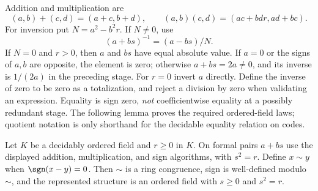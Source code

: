 Addition and multiplication are
\[
 (a,b)+(c,d)=(a+c,b+d),\qquad
 (a,b)(c,d)=(ac+bd r,ad+bc).
\]
For inversion put $N=a^2-b^2r$. If $N\ne0$, use
\[
 (a+bs)^{-1}=(a-bs)/N.
\]
If $N=0$ and $r>0$, then $a$ and $bs$ have equal absolute value.
If $a=0$ or the signs of $a,b$ are opposite, the element is zero;
otherwise $a+bs=2a\ne0$, and its inverse is $1/(2a)$ in the preceding
stage. For $r=0$ invert $a$ directly. Define the inverse of zero to be
zero as a totalization, and reject a division by zero when validating
an expression. Equality is sign zero, \emph{not} coefficientwise equality
at a possibly redundant stage. The following lemma proves the required
ordered-field laws; quotient notation is only shorthand for the
decidable equality relation on codes.

\begin{lemma}\label{lem:orderedstage}
Let $K$ be a decidably ordered field and $r\geq0$ in $K$. On formal
pairs $a+bs$ use the displayed addition, multiplication, and sign
algorithms, with $s^2=r$. Define $x\sim y$ when $\sgn(x-y)=0$.
Then $\sim$ is a ring congruence, sign is well-defined modulo $\sim$,
and the represented structure is an ordered field with $s\geq0$
and $s^2=r$.
\end{lemma}
